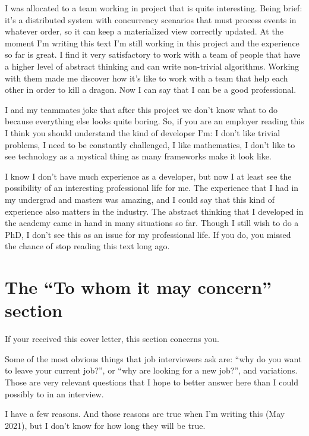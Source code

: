 \documentclass[11pt,a4paper,sans]{moderncv}
\begin{document}
\medskip

I was allocated to a team working in project that is quite interesting.
Being brief: it's a distributed system with concurrency scenarios that must process events in whatever order, so it can keep a materialized view correctly updated.
At the moment I'm writing this text I'm still working in this project and the experience so far is great.
I find it very satisfactory to work with a team of people that have a higher level of abstract thinking and can write non-trivial algorithms.
Working with them made me discover how it's like to work with a team that help each other in order to kill a dragon.
Now I can say that I can be a good professional.

\medskip

I and my teammates joke that after this project we don't know what to do because everything else looks quite boring.
So, if you are an employer reading this I think you should understand the kind of developer I'm:
I don't like trivial problems, I need to be constantly challenged, I like mathematics, I don't like to see technology as a mystical thing as many frameworks make it look like.

\medskip

I know I don't have much experience as a developer, but now I at least see the possibility of an interesting professional life for me.
The experience that I had in my undergrad and masters was amazing, and I could say that this kind of experience also matters in the industry.
The abstract thinking that I developed in the academy came in hand in many situations so far.
Though I still wish to do a PhD, I don't see this as an issue for my professional life.
If you do, you missed the chance of stop reading this text long ago.

\section{The ``To whom it may concern'' section}
If your received this cover letter, this section concerns you.

\medskip

Some of the most obvious things that job interviewers ask are:
``why do you want to leave your current job?'', or
``why are looking for a new job?'', and variations.
Those are very relevant questions that I hope to better answer here than I could possibly to in an interview.

\medskip

I have a few reasons. And those reasons are true when I'm writing this (May 2021), but I don't know for how long they will be true.
\end{document}
